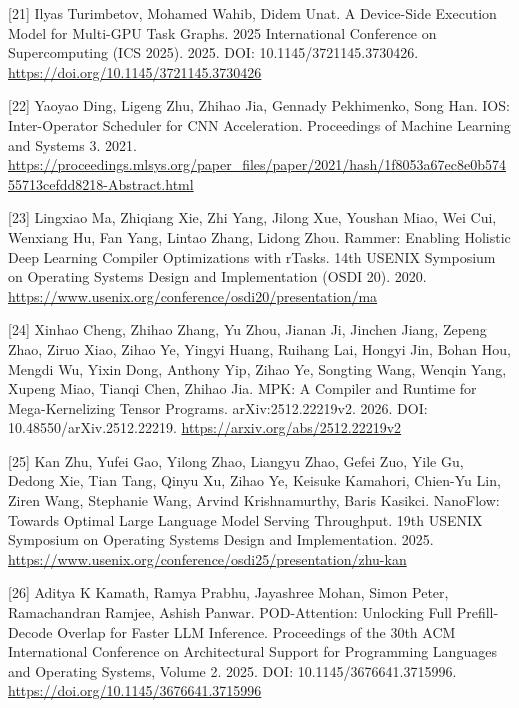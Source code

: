 \documentclass[UTF8,11pt,fontset=windows]{ctexart}
\begin{document}
\leavevmode{}%
{[}21{]} Ilyas Turimbetov, Mohamed Wahib, Didem Unat. A Device-Side Execution Model for Multi-GPU Task Graphs. 2025 International Conference on Supercomputing (ICS 2025). 2025. DOI: 10.1145/3721145.3730426. \url{https://doi.org/10.1145/3721145.3730426}

\leavevmode{}%
{[}22{]} Yaoyao Ding, Ligeng Zhu, Zhihao Jia, Gennady Pekhimenko, Song Han. IOS: Inter-Operator Scheduler for CNN Acceleration. Proceedings of Machine Learning and Systems 3. 2021. \url{https://proceedings.mlsys.org/paper_files/paper/2021/hash/1f8053a67ec8e0b57455713cefdd8218-Abstract.html}

\leavevmode{}%
{[}23{]} Lingxiao Ma, Zhiqiang Xie, Zhi Yang, Jilong Xue, Youshan Miao, Wei Cui, Wenxiang Hu, Fan Yang, Lintao Zhang, Lidong Zhou. Rammer: Enabling Holistic Deep Learning Compiler Optimizations with rTasks. 14th USENIX Symposium on Operating Systems Design and Implementation (OSDI 20). 2020. \url{https://www.usenix.org/conference/osdi20/presentation/ma}

\leavevmode{}%
{[}24{]} Xinhao Cheng, Zhihao Zhang, Yu Zhou, Jianan Ji, Jinchen Jiang, Zepeng Zhao, Ziruo Xiao, Zihao Ye, Yingyi Huang, Ruihang Lai, Hongyi Jin, Bohan Hou, Mengdi Wu, Yixin Dong, Anthony Yip, Zihao Ye, Songting Wang, Wenqin Yang, Xupeng Miao, Tianqi Chen, Zhihao Jia. MPK: A Compiler and Runtime for Mega-Kernelizing Tensor Programs. arXiv:2512.22219v2. 2026. DOI: 10.48550/arXiv.2512.22219. \url{https://arxiv.org/abs/2512.22219v2}

\leavevmode{}%
{[}25{]} Kan Zhu, Yufei Gao, Yilong Zhao, Liangyu Zhao, Gefei Zuo, Yile Gu, Dedong Xie, Tian Tang, Qinyu Xu, Zihao Ye, Keisuke Kamahori, Chien-Yu Lin, Ziren Wang, Stephanie Wang, Arvind Krishnamurthy, Baris Kasikci. NanoFlow: Towards Optimal Large Language Model Serving Throughput. 19th USENIX Symposium on Operating Systems Design and Implementation. 2025. \url{https://www.usenix.org/conference/osdi25/presentation/zhu-kan}

\leavevmode{}%
{[}26{]} Aditya K Kamath, Ramya Prabhu, Jayashree Mohan, Simon Peter, Ramachandran Ramjee, Ashish Panwar. POD-Attention: Unlocking Full Prefill-Decode Overlap for Faster LLM Inference. Proceedings of the 30th ACM International Conference on Architectural Support for Programming Languages and Operating Systems, Volume 2. 2025. DOI: 10.1145/3676641.3715996. \url{https://doi.org/10.1145/3676641.3715996}
\end{document}
